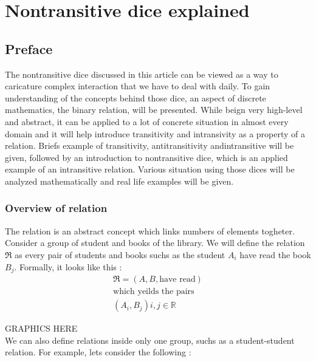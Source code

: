 \documentclass{article}
\begin{document}
\section{Nontransitive dice explained}

\subsection{Preface}
    
    The nontransitive dice discussed in this article can be viewed as a way to
    caricature complex interaction that we have to deal with daily. To gain
    understanding of the concepts behind those dice, an aspect of discrete
    mathematics, the binary relation, will be presented. While beign very
    high-level and abstract, it can be applied to a lot of concrete situation in
    almost every domain and it will help introduce transitivity and intransivity
    as a property of a relation. Briefs example of transitivity,
    antitransitivity andintransitive will be given, followed by an introduction
    to nontransitive dice, which is an applied example of an intransitive
    relation. Various situation using those dices will be
     analyzed mathematically and real life examples will be given.
	
	\subsubsection{Overview of relation}
    The relation is an abstract concept which links numbers of elements togheter.
    Consider a group of student and books of the library. We will define the
    relation $ \mathfrak{R} $ as every pair of students and books suchs as the
    student $A_{i}$ have read the book $B_{j}$.
    Formally, it looks like this :
	\begin{equation}
	\begin{split}
	
	\mathfrak{R} = (A,B, \text{have read})\\
	\text{which yeilds the pairs} \\
	(A_{i}, B_{j}) i,j \in \mathbb{R}
	
	\end{split}
	\end{equation}

    GRAPHICS HERE\\	
    
    We can also define relations inside only one group, suchs as a student-student
    relation.
    For example, lets consider the following :
	
\end{document}
